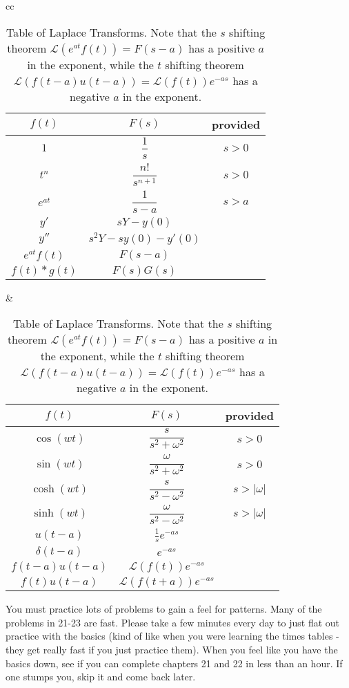 \begin{table}[h]
\begin{center}
\begin{tabular}{cc}
\begin{tabular}[t]{|c|cc|}
\hline
$f(t)$ & $F(s)$ & provided\\
\hline\hline
$1$					&$\dfrac{1}{s}$ 							&$s>0$\\\hline
$t^n$				&$\dfrac{n!}{s^{n+1}}$ 			&$s>0$\\\hline
$e^{at}$		&$\dfrac{1}{s-a}$ 			&$s>a$\\\hline
$y'$					&$sY-y(0)$ 						&\\\hline
$y''$					&$s^2Y-sy(0)-y'(0)$ 						&\\\hline
$e^{at}f(t)$  &$F(s-a)$ 						&\\\hline
$f(t)*g(t)$  &$F(s)G(s)$ 						&\\\hline
\end{tabular}
&
\begin{tabular}[t]{|c|cc|}
\hline
$f(t)$ & $F(s)$ & provided\\
\hline\hline
$\cos(wt)$  &$\dfrac{s}{s^2+\omega^2}$ 			&$s>0$\\\hline
$\sin(wt)$  &$\dfrac{\omega}{s^2+\omega^2}$ 			&$s>0$\\\hline
$\cosh(wt)$ &$\dfrac{s}{s^2-\omega^2}$ 			&$s>|\omega|$\\\hline
$\sinh(wt)$ &$\dfrac{\omega}{s^2-\omega^2}$ 			&$s>|\omega|$\\\hline
$u(t-a)$  &$\frac{1}{s}e^{-as}$ 						&\\\hline
$\delta(t-a)$  &$e^{-as}$ 						&\\\hline
$f(t-a)u(t-a)$  &$\mathscr{L}(f(t))e^{-as}$ 						&\\
$f(t)u(t-a)$  &$\mathscr{L}(f(t+a))e^{-as}$ 						&\\
\hline
\end{tabular}
\end{tabular}
\end{center}
\caption{Table of Laplace Transforms\label{big laplace table}. Note that the $s$ shifting theorem $\mathscr{L}(e^{at}f(t))=F(s-a)$ has a positive $a$ in the exponent, while the $t$ shifting theorem $\mathscr{L}(f(t-a)u(t-a))=\mathscr{L}(f(t))e^{-as}$ has a negative $a$ in the exponent.
}
\end{table}


You must practice lots of problems to gain a feel for patterns.  Many of the problems in 21-23 are fast. Please take a few minutes every day to just flat out practice with the basics (kind of like when you were learning the times tables - they get really fast if you just practice them). When you feel like you have the basics down, see if you can complete chapters 21 and 22 in less than an hour. If one stumps you, skip it and come back later.  

